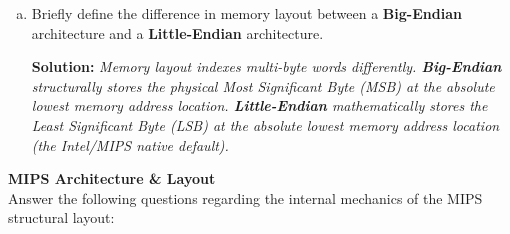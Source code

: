 \documentclass[letterpaper]{report}
\begin{document}
\begin{enumerate}[(a)]
    \item Briefly define the difference in memory layout between a \textbf{Big-Endian} architecture and a \textbf{Little-Endian} architecture.
    
    {\color{red} \textbf{Solution:} \textit{Memory layout indexes multi-byte words differently. \textbf{Big-Endian} structurally stores the physical Most Significant Byte (MSB) at the absolute lowest memory address location. \textbf{Little-Endian} mathematically stores the Least Significant Byte (LSB) at the absolute lowest memory address location (the Intel/MIPS native default).}}
\end{enumerate}
\ep
\vf
\newpage

%
 {\bf MIPS Architecture \& Layout} \\
Answer the following questions regarding the internal mechanics of the MIPS structural layout:
\end{document}
